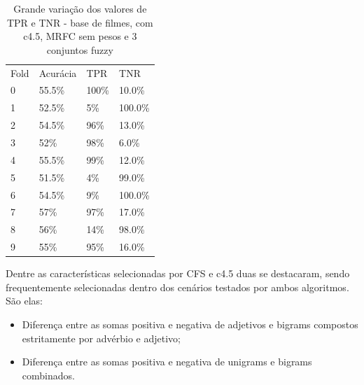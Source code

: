 \documentclass[template.tex]{subfiles}
\begin{document}


\begin{table}[htbp]
	\centering
    \begin{tabular}{llll}
    Fold & Acurácia & TPR & TNR \\
    0 & 55.5\% & 100\% & 10.0\% \\
    1 & 52.5\% & 5\% & 100.0\% \\
    2 & 54.5\% & 96\% & 13.0\% \\
    3 & 52\% & 98\% & 6.0\% \\
    4 & 55.5\% & 99\% & 12.0\% \\
    5 & 51.5\% & 4\% & 99.0\% \\
    6 & 54.5\% & 9\% & 100.0\% \\
    7 & 57\% & 97\% & 17.0\% \\
    8 & 56\% & 14\% & 98.0\% \\
    9 & 55\% & 95\% & 16.0\% \\
    \end{tabular}
    \caption{Grande variação dos valores de TPR e TNR - base de filmes, com c4.5, MRFC sem pesos e 3 conjuntos fuzzy}
    \label{table:movie_folds}
\end{table}


Dentre as características selecionadas por CFS e c4.5 duas se destacaram, sendo frequentemente selecionadas dentro dos cenários testados por ambos algoritmos. São elas:

\begin{itemize}
\item Diferença entre as somas positiva e negativa de adjetivos e bigrams compostos estritamente por advérbio e adjetivo;
\item Diferença entre as somas positiva e negativa de unigrams e bigrams combinados.
\end{itemize}
\end{document}
